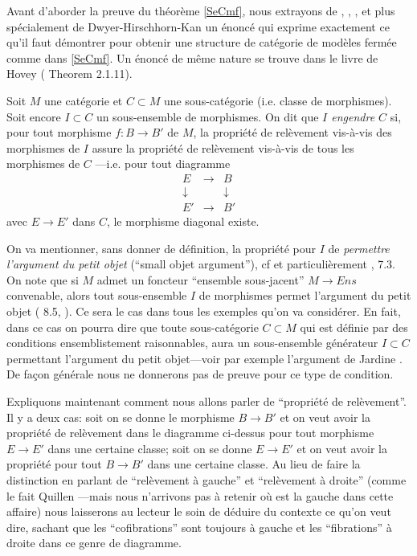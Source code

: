 \documentclass[12pt]{article}
\begin{document}
Avant d'aborder la preuve du th\'eor\`eme \ref{SeCmf},
nous extrayons de \cite{Jardine}, \cite{JardineGoerssBook},
\cite{Hirschhorn},  et plus sp\'ecialement de Dwyer-Hirschhorn-Kan \cite{DHK} un
\'enonc\'e qui exprime exactement ce qu'il faut d\'emontrer pour obtenir une
structure de cat\'egorie de mod\`eles ferm\'ee comme dans  \ref{SeCmf}. Un
\'enonc\'e de m\^eme nature se trouve dans le livre de Hovey (\cite{HoveyBook}
Theorem 2.1.11).


Soit $M$ une cat\'egorie et $C\subset M$ une sous-cat\'egorie (i.e. classe de
morphismes). Soit encore $I\subset C$ un sous-ensemble de morphismes. On dit
que {\em $I$ engendre $C$} si, pour tout morphisme $f:B\rightarrow B'$ de $M$,
la propri\'et\'e de rel\`evement \cite{Quillen} vis-\`a-vis des morphismes de
$I$ assure la propri\'et\'e de rel\`evement vis-\`a-vis de tous les
morphismes de
$C$  ---i.e.  pour tout diagramme
$$
\begin{array}{ccc}
E&\rightarrow & B \\
\downarrow && \downarrow \\
E'&\rightarrow & B'
\end{array}
$$
avec  $E\rightarrow E'$ dans $C$,
le morphisme diagonal existe.

On va mentionner, sans donner de d\'efinition, la propri\'et\'e pour $I$ de {\em
permettre l'ar\-gu\-ment du petit objet} (``small objet argument''), cf
\cite{Hirschhorn}  \cite{JardineGoerssBook} et particuli\`erement \cite{DHK},
7.3. On note que si $M$ admet un foncteur ``ensemble sous-jacent''
$M\rightarrow Ens$ convenable, alors tout sous-ensemble $I$ de morphismes
permet l'argument du petit objet (\cite{DHK} 8.5, \cite{Hirschhorn}). Ce
sera le cas dans tous les exemples qu'on va consid\'erer. En fait, dans ce
cas on
pourra dire que toute sous-cat\'egorie $C\subset M$ qui est d\'efinie par des
conditions ensemblistement raisonnables, aura un sous-ensemble g\'en\'erateur
$I\subset C$ permettant l'argument du petit objet---voir par exemple
l'argument de Jardine \cite{Jardine}. De fa\c{c}on g\'en\'erale nous ne
donnerons pas de preuve pour ce type de condition.

Expliquons maintenant comment nous allons parler de ``propri\'et\'e de
rel\`evement''.
Il y a deux cas: soit on se donne le morphisme $B\rightarrow B'$ et
on veut avoir la propri\'et\'e de rel\`evement dans le diagramme
ci-dessus pour tout
morphisme $E\rightarrow E'$ dans une certaine classe; soit on se donne
$E\rightarrow E'$ et on veut avoir la propri\'et\'e pour tout $B\rightarrow B'$
dans une certaine classe. Au lieu de faire la distinction en parlant de
``rel\`evement \`a gauche'' et ``rel\`evement \`a droite'' (comme le fait
Quillen
\cite{Quillen}---mais nous n'arrivons pas \`a retenir o\`u est la gauche dans
cette affaire)
nous laisserons au lecteur le soin de d\'eduire du contexte ce qu'on veut dire,
sachant que les ``cofibrations'' sont toujours \`a gauche et les
``fibrations'' \`a droite dans ce genre de diagramme.
\end{document}
